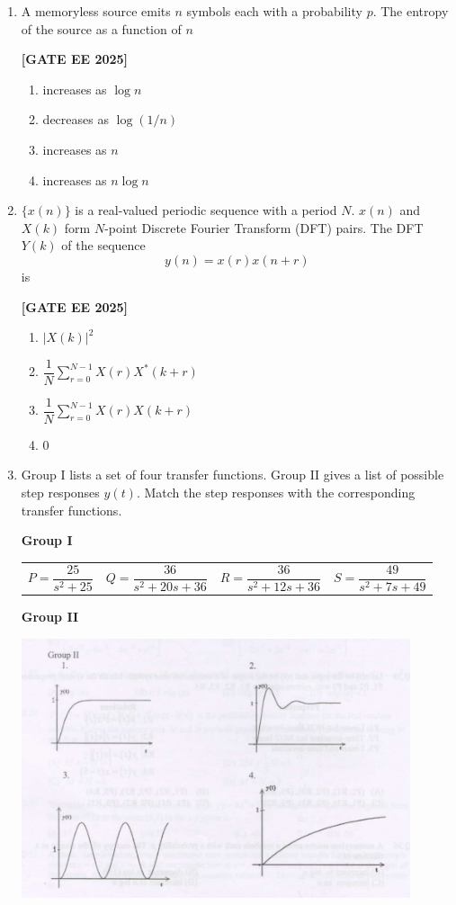 \documentclass[12pt]{article}
\begin{document}
\begin{enumerate}[leftmargin=*, label=\textbf{Q.\arabic*:}]
\item A memoryless source emits $n$ symbols each with a probability $p$. The entropy of the source as a function of $n$
 
\noindent \textbf{[GATE EE 2025]}
\begin{enumerate}[label=(\Alph*)]
  \item increases as $\log n$
  \item decreases as $\log(1/n)$
  \item increases as $n$
  \item increases as $n \log n$
\end{enumerate}

\item $\{x(n)\}$ is a real-valued periodic sequence with a period $N$. $x(n)$ and $X(k)$ form $N$-point Discrete Fourier Transform (DFT) pairs. The DFT $Y(k)$ of the sequence
\[
y(n) = x(r) x(n + r)
\]
is
 
\noindent \textbf{[GATE EE 2025]}
\begin{enumerate}[label=(\Alph*)]
  \item $|X(k)|^2 $
  \item $\dfrac{1}{N} \sum_{r=0}^{N-1} X(r) X^*(k+r) $
  \item $\dfrac{1}{N} \sum_{r=0}^{N-1} X(r) X(k+r) $
  \item $0$
\end{enumerate}

\item
Group I lists a set of four transfer functions. Group II gives a list of possible step responses $y(t)$. Match the step responses with the corresponding transfer functions.

\textbf{Group I}\vspace{0.2em}
\begin{tabular}{llll}
  $P = \dfrac{25}{s^2 + 25 }$ &
  $Q = \dfrac{36}{s^2 + 20s + 36}$ &
  $R = \dfrac{36}{s^2 + 12s + 36 }$ &
  $S = \dfrac{49}{s^2 + 7s + 49}$
\end{tabular}
\vspace{0.6em}
\newpage
\textbf{Group II}
\begin{center}
\includegraphics[width=0.9\textwidth]{figs/q38.png}
\end{center}
 

\end{enumerate}
\end{document}
